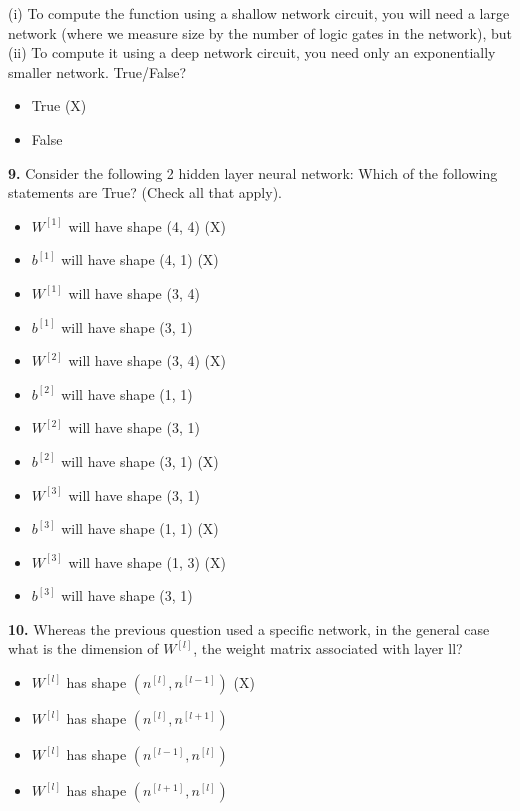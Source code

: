 (i) To compute the function using a shallow network circuit, you will need a large network (where we measure size by the number of logic gates in the network), but (ii) To compute it using a deep network circuit, you need only an exponentially smaller network. True/False?
\begin{itemize}
    \item True (X)
    \item False
\end{itemize}
\textbf{9.} Consider the following 2 hidden layer neural network:
Which of the following statements are True? (Check all that apply).
\begin{itemize}
    \item $W^{[1]}$ will have shape (4, 4) (X)
    \item $b^{[1]}$ will have shape (4, 1) (X)
    \item $W^{[1]}$ will have shape (3, 4)
    \item $b^{[1]}$ will have shape (3, 1)
    \item $W^{[2]}$ will have shape (3, 4) (X)
    \item $b^{[2]}$ will have shape (1, 1)
    \item $W^{[2]}$ will have shape (3, 1)
    \item $b^{[2]}$ will have shape (3, 1) (X)
    \item $W^{[3]}$ will have shape (3, 1)
    \item $b^{[3]}$ will have shape (1, 1) (X)
    \item $W^{[3]}$ will have shape (1, 3) (X)
    \item $b^{[3]}$ will have shape (3, 1)
\end{itemize}
\textbf{10.} Whereas the previous question used a specific network, in the general case what is the dimension of $W^{[l]}$, the weight matrix associated with layer ll?
\begin{itemize}
    \item $W^{[l]}$ has shape $(n^{[l]}, n^{[l-1]})$ (X)
    \item $W^{[l]}$ has shape $(n^{[l]}, n^{[l+1]})$
    \item $W^{[l]}$ has shape $(n^{[l-1]}, n^{[l]})$
    \item $W^{[l]}$ has shape $(n^{[l+1]}, n^{[l]})$
\end{itemize}